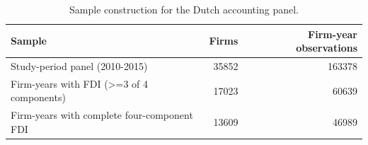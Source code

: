\begin{table}
\caption{Sample construction for the Dutch accounting panel.}
\label{tab:sample_construction}
\begin{tabular}{lrr}
\toprule
Sample & Firms & Firm-year observations \\
\midrule
Study-period panel (2010-2015) & 35852 & 163378 \\
Firm-years with FDI (>=3 of 4 components) & 17023 & 60639 \\
Firm-years with complete four-component FDI & 13609 & 46989 \\
\bottomrule
\end{tabular}
\end{table}
